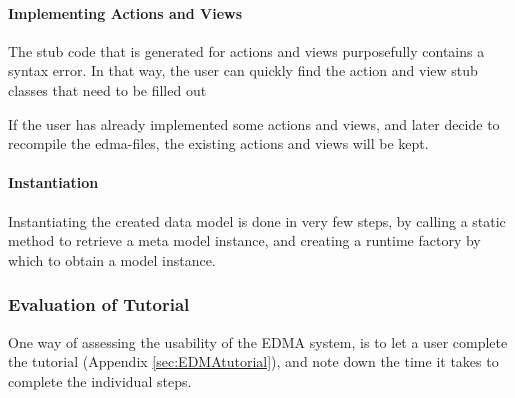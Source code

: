 \paragraph{Implementing Actions and Views}

The stub code that is generated for actions and views purposefully
contains a syntax error. In that way, the user can quickly find the
action and view stub classes that need to be filled out

If the user has already implemented some actions and views, and later
decide to recompile the edma-files, the existing actions and views
will be kept.


\paragraph{Instantiation}

Instantiating the created data model is done in very few steps, by
calling a static method to retrieve a meta model instance, and creating
a runtime factory by which to obtain a model instance.


\subsubsection{Evaluation of Tutorial}

One way of assessing the usability of the EDMA system, is to let a
user complete the tutorial (Appendix \ref{sec:EDMAtutorial}), and
note down the time it takes to complete the individual steps. 
